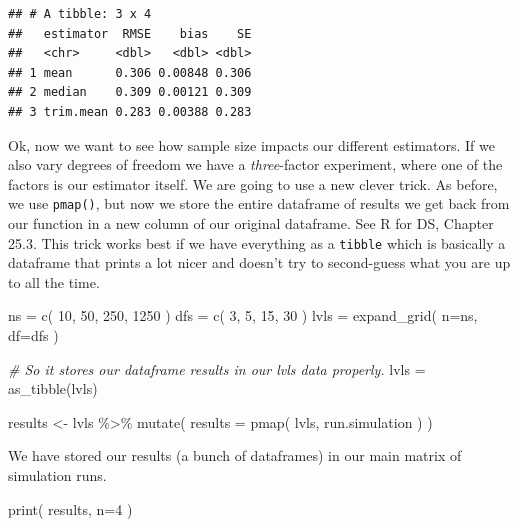 \documentclass[
]{book}
\newenvironment{Shaded}{\begin{snugshade}}{\end{snugshade}}
\newcommand{\AttributeTok}[1]{\textcolor[rgb]{0.77,0.63,0.00}{#1}}
\newcommand{\CommentTok}[1]{\textcolor[rgb]{0.56,0.35,0.01}{\textit{#1}}}
\newcommand{\DecValTok}[1]{\textcolor[rgb]{0.00,0.00,0.81}{#1}}
\newcommand{\FunctionTok}[1]{\textcolor[rgb]{0.00,0.00,0.00}{#1}}
\newcommand{\NormalTok}[1]{#1}
\newcommand{\OtherTok}[1]{\textcolor[rgb]{0.56,0.35,0.01}{#1}}
\newcommand{\SpecialCharTok}[1]{\textcolor[rgb]{0.00,0.00,0.00}{#1}}
\begin{document}
\begin{verbatim}
## # A tibble: 3 x 4
##   estimator  RMSE    bias    SE
##   <chr>     <dbl>   <dbl> <dbl>
## 1 mean      0.306 0.00848 0.306
## 2 median    0.309 0.00121 0.309
## 3 trim.mean 0.283 0.00388 0.283
\end{verbatim}

Ok, now we want to see how sample size impacts our different estimators. If
we also vary degrees of freedom we have a \emph{three}-factor experiment, where
one of the factors is our estimator itself. We are going to use a new clever
trick. As before, we use \texttt{pmap()}, but now we store the entire dataframe of
results we get back from our function in a new column of our original
dataframe. See R for DS, Chapter 25.3. This trick works best if we have
everything as a \texttt{tibble} which is basically a dataframe that prints a lot
nicer and doesn't try to second-guess what you are up to all the time.

\begin{Shaded}
\begin{Highlighting}[]
\NormalTok{ns }\OtherTok{=} \FunctionTok{c}\NormalTok{( }\DecValTok{10}\NormalTok{, }\DecValTok{50}\NormalTok{, }\DecValTok{250}\NormalTok{, }\DecValTok{1250}\NormalTok{ )}
\NormalTok{dfs }\OtherTok{=} \FunctionTok{c}\NormalTok{( }\DecValTok{3}\NormalTok{, }\DecValTok{5}\NormalTok{, }\DecValTok{15}\NormalTok{, }\DecValTok{30}\NormalTok{ )}
\NormalTok{lvls }\OtherTok{=} \FunctionTok{expand\_grid}\NormalTok{( }\AttributeTok{n=}\NormalTok{ns, }\AttributeTok{df=}\NormalTok{dfs )}

\CommentTok{\# So it stores our dataframe results in our lvls data properly.}
\NormalTok{lvls }\OtherTok{=} \FunctionTok{as\_tibble}\NormalTok{(lvls)}

\NormalTok{results }\OtherTok{\textless{}{-}}\NormalTok{ lvls }\SpecialCharTok{\%\textgreater{}\%} \FunctionTok{mutate}\NormalTok{( }\AttributeTok{results =} \FunctionTok{pmap}\NormalTok{( lvls, run.simulation ) )}
\end{Highlighting}
\end{Shaded}

We have stored our results (a bunch of dataframes) in our main matrix of
simulation runs.

\begin{Shaded}
\begin{Highlighting}[]
\FunctionTok{print}\NormalTok{( results, }\AttributeTok{n=}\DecValTok{4}\NormalTok{ )}
\end{Highlighting}
\end{Shaded}
\end{document}
